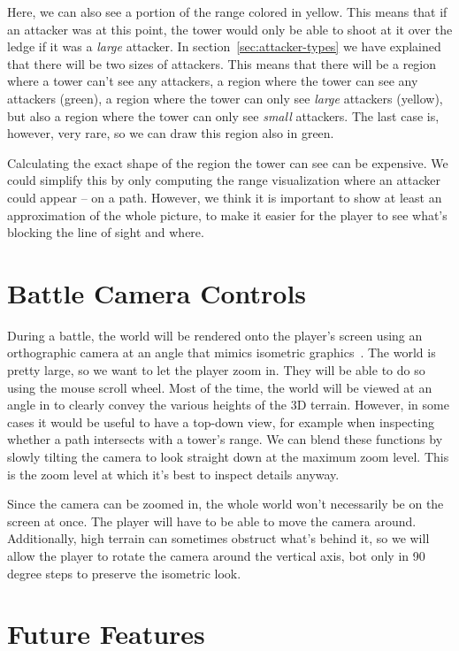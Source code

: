 Here, we can also see a portion of the range colored in yellow.
This means that if an attacker was at this point, the tower would only be able to shoot at it over the ledge if it was a \emph{large} attacker.
In section~\ref{sec:attacker-types} we have explained that there will be two sizes of attackers.
This means that there will be a region where a tower can't see any attackers, a region where the tower can see any attackers (green), a region where the tower can only see \emph{large} attackers (yellow), but also a region where the tower can only see \emph{small} attackers.
The last case is, however, very rare, so we can draw this region also in green.

Calculating the exact shape of the region the tower can see can be expensive.
We could simplify this by only computing the range visualization where an attacker could appear -- on a path.
However, we think it is important to show at least an approximation of the whole picture, to make it easier for the player to see what's blocking the line of sight and where.

\section{Battle Camera Controls}

During a battle, the world will be rendered onto the player's screen using an orthographic camera at an angle that mimics isometric graphics~\cite{IsometricWiki}.
The world is pretty large, so we want to let the player zoom in.
They will be able to do so using the mouse scroll wheel.
Most of the time, the world will be viewed at an angle in to clearly convey the various heights of the 3D terrain.
However, in some cases it would be useful to have a top-down view, for example when inspecting whether a path intersects with a tower's range.
We can blend these functions by slowly tilting the camera to look straight down at the maximum zoom level.
This is the zoom level at which it's best to inspect details anyway.

Since the camera can be zoomed in, the whole world won't necessarily be on the screen at once.
The player will have to be able to move the camera around.
Additionally, high terrain can sometimes obstruct what's behind it, so we will allow the player to rotate the camera around the vertical axis, bot only in 90 degree steps to preserve the isometric look.

\section{Future Features}

